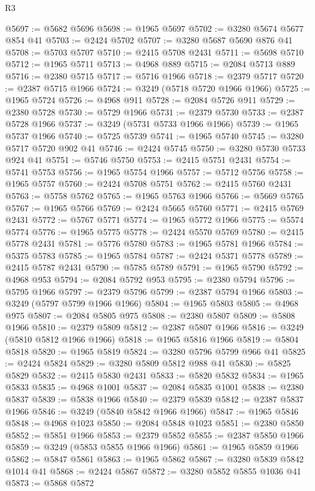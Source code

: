 \begin{lexlean}{R3}
\begin{coremodule}
@5697 := @5682 @5696
@5698 := @1965 @5697
@5702 := @3280 @5674 @5677 @854 @41
@5703 := @2424 @5702
@5707 := @3280 @5687 @5690 @876 @41
@5708 := @5703 @5707
@5710 := @2415 @5708 @2431
@5711 := @5698 @5710
@5712 := @1965 @5711
@5713 := @4968 @889
@5715 := @2084 @5713 @889
@5716 := @2380 @5715
@5717 := @5716 @1966
@5718 := @2379 @5717
@5720 := @2387 @5715 @1966
@5724 := @3249 (@5718 @5720 @1966 @1966)
@5725 := @1965 @5724
@5726 := @4968 @911
@5728 := @2084 @5726 @911
@5729 := @2380 @5728
@5730 := @5729 @1966
@5731 := @2379 @5730
@5733 := @2387 @5728 @1966
@5737 := @3249 (@5731 @5733 @1966 @1966)
@5739 := @1965 @5737 @1966
@5740 := @5725 @5739
@5741 := @1965 @5740
@5745 := @3280 @5717 @5720 @902 @41
@5746 := @2424 @5745
@5750 := @3280 @5730 @5733 @924 @41
@5751 := @5746 @5750
@5753 := @2415 @5751 @2431
@5754 := @5741 @5753
@5756 := @1965 @5754 @1966
@5757 := @5712 @5756
@5758 := @1965 @5757
@5760 := @2424 @5708 @5751
@5762 := @2415 @5760 @2431
@5763 := @5758 @5762
@5765 := @1965 @5763 @1966
@5766 := @5669 @5765
@5767 := @1965 @5766
@5769 := @2424 @5665 @5760
@5771 := @2415 @5769 @2431
@5772 := @5767 @5771
@5774 := @1965 @5772 @1966
@5775 := @5574 @5774
@5776 := @1965 @5775
@5778 := @2424 @5570 @5769
@5780 := @2415 @5778 @2431
@5781 := @5776 @5780
@5783 := @1965 @5781 @1966
@5784 := @5375 @5783
@5785 := @1965 @5784
@5787 := @2424 @5371 @5778
@5789 := @2415 @5787 @2431
@5790 := @5785 @5789
@5791 := @1965 @5790
@5792 := @4968 @953
@5794 := @2084 @5792 @953
@5795 := @2380 @5794
@5796 := @5795 @1966
@5797 := @2379 @5796
@5799 := @2387 @5794 @1966
@5803 := @3249 (@5797 @5799 @1966 @1966)
@5804 := @1965 @5803
@5805 := @4968 @975
@5807 := @2084 @5805 @975
@5808 := @2380 @5807
@5809 := @5808 @1966
@5810 := @2379 @5809
@5812 := @2387 @5807 @1966
@5816 := @3249 (@5810 @5812 @1966 @1966)
@5818 := @1965 @5816 @1966
@5819 := @5804 @5818
@5820 := @1965 @5819
@5824 := @3280 @5796 @5799 @966 @41
@5825 := @2424 @5824
@5829 := @3280 @5809 @5812 @988 @41
@5830 := @5825 @5829
@5832 := @2415 @5830 @2431
@5833 := @5820 @5832
@5834 := @1965 @5833
@5835 := @4968 @1001
@5837 := @2084 @5835 @1001
@5838 := @2380 @5837
@5839 := @5838 @1966
@5840 := @2379 @5839
@5842 := @2387 @5837 @1966
@5846 := @3249 (@5840 @5842 @1966 @1966)
@5847 := @1965 @5846
@5848 := @4968 @1023
@5850 := @2084 @5848 @1023
@5851 := @2380 @5850
@5852 := @5851 @1966
@5853 := @2379 @5852
@5855 := @2387 @5850 @1966
@5859 := @3249 (@5853 @5855 @1966 @1966)
@5861 := @1965 @5859 @1966
@5862 := @5847 @5861
@5863 := @1965 @5862
@5867 := @3280 @5839 @5842 @1014 @41
@5868 := @2424 @5867
@5872 := @3280 @5852 @5855 @1036 @41
@5873 := @5868 @5872

\end{coremodule}
\end{lexlean}
